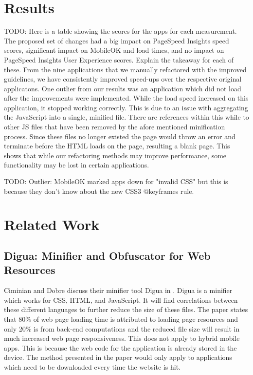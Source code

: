 \documentclass{acm_proc_article-sp}
\begin{document}
\section{Results}
TODO: Here is a table showing the scores for the apps for each measurement. The proposed set of changes had a big impact on PageSpeed Insights speed scores, significant impact on MobileOK and load times, and no impact on PageSpeed Insights User Experience scores. Explain the takeaway for each of these. 
From the nine applications that we manually refactored with the improved guidelines, we have consistently improved speed-ups over the respective original applicatons.
One outlier from our results was an application which did not load after the improvements were implemented.
While the load speed increased on this application, it stopped working correctly.
This is due to an issue with aggregating the JavaScript into a single, minified file.
There are references within this while to other JS files that have been removed by the afore mentioned minification process.
Since these files no longer existed the page would throw an error and terminate before the HTML loads on the page, resulting a blank page.
This shows that while our refactoring methods may improve performance, some functionality may be lost in certain applications.

TODO: Outlier: MobileOK marked apps down for "invalid CSS" but this is because they don't know about the new CSS3 @keyframes rule.
\section{Related Work}
\subsection{Digua: Minifier and Obfuscator for Web Resources \cite{ciminiandigua}}
Ciminian and Dobre discuss their minifier tool Digua in \cite{ciminiandigua}. 
Digua is a minifier which works for CSS, HTML, and JavaScript.  
It will find correlations between these different languages to further reduce the size of these files.
The paper states that 80\% of web page loading time is attributed to loading page resources and only 20\% is from back-end computations and the reduced file size will result in much increased web page responsiveness.
This does not apply to hybrid mobile apps.
This is because the web code for the application is already stored in the device.
The method presented in the paper would only apply to applications which need to be downloaded every time the website is hit. 
\end{document}
